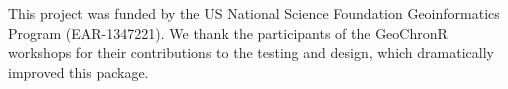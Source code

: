 \documentclass[gchron, manuscript]{copernicus}
\begin{document}
\begin{acknowledgements}
This project was funded by the US National Science Foundation Geoinformatics Program (EAR-1347221). We thank the participants of the GeoChronR workshops for their contributions to the testing and design, which dramatically improved this package.
\end{acknowledgements}







\end{document}
